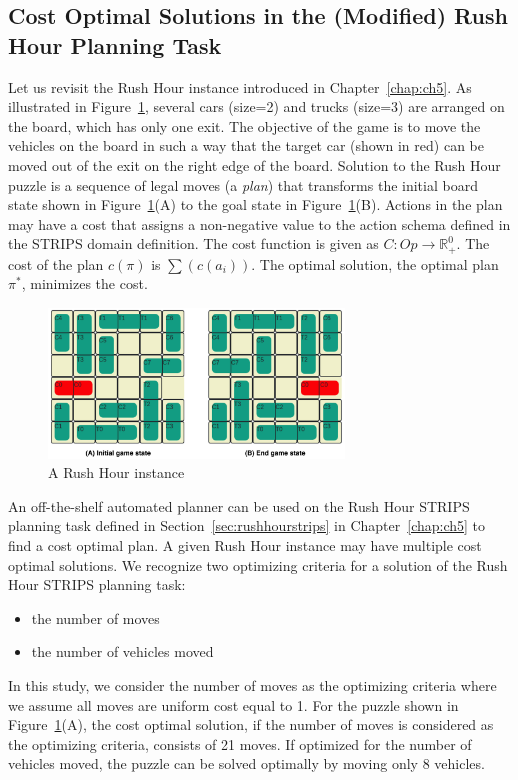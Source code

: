 \subsection{Cost Optimal Solutions in the (Modified) Rush Hour Planning Task}
\label{sec:costoptimal}
Let us revisit the Rush Hour instance introduced in Chapter~\ref{chap:ch5}. As illustrated in Figure~\ref{fig:board}, several cars (size=2) and trucks (size=3) are arranged on the board, which has only one exit.
The objective of the game is to move the vehicles on the board in such a way that the target car (shown in red) can be moved out of the exit on the right edge of the board. Solution to the Rush Hour puzzle is a sequence of legal moves (a \textit{plan}) that transforms the initial board state shown in Figure~\ref{fig:board}(A) to the goal state in Figure~\ref{fig:board}(B). 
Actions in the plan may have a cost that assigns a non-negative value to the action schema defined in the STRIPS domain definition. 
The cost function is given as $C: Op \rightarrow \mathbb{R}^0_+$. 
The cost of the plan $c(\pi)$ is  $\sum(c(a_i))$. The optimal solution, the optimal plan $\pi^*$, minimizes the cost. 

\begin{figure}[tpb]
  \centering
    	\includegraphics[width=0.7\textwidth]{img/figure4.jpg}
    	\caption{A Rush Hour instance}
    	\label{fig:board}
\end{figure}

An off-the-shelf automated planner can be used on the Rush Hour STRIPS planning task defined in Section~\ref{sec:rushhourstrips} in
Chapter~\ref{chap:ch5} to find a cost optimal plan.
A given Rush Hour instance may have multiple cost optimal solutions.
We recognize two optimizing criteria for a solution of the Rush Hour STRIPS planning task:
\begin{itemize}
\item the number of moves
\item the number of vehicles moved
\end{itemize}
In this study, we consider the number of moves as the optimizing criteria where we assume all moves are uniform cost equal to 1.
For the puzzle shown in Figure~\ref{fig:board}(A), the cost optimal solution, if the number of moves is considered as
the optimizing criteria, consists of 21 moves. 
If optimized for the number of vehicles moved,
the puzzle can be solved optimally by moving only 8 vehicles.

